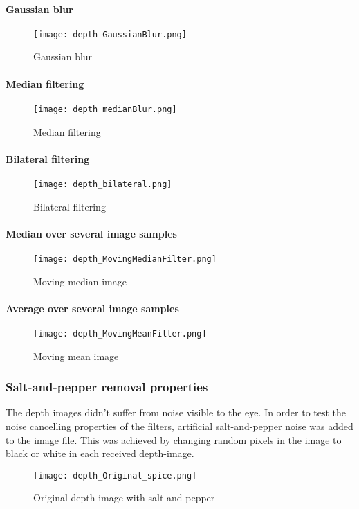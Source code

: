 \documentclass[DIV12,a4paper]{scrartcl}
\begin{document}
\paragraph{Gaussian blur}
\begin{figure}[!htbp]
  \centering
  \texttt{[image: depth\_GaussianBlur.png]}
  \caption{Gaussian blur}
  \label{fig:gaussian_blur}
\end{figure}
\paragraph{Median filtering}
\begin{figure}[!htbp]
  \centering
  \texttt{[image: depth\_medianBlur.png]}
  \caption{Median filtering}
  \label{fig:median_depth}
\end{figure}
\paragraph{Bilateral filtering}
\begin{figure}[!htbp]
  \centering
  \texttt{[image: depth\_bilateral.png]}
  \caption{Bilateral filtering}
  \label{fig:bilateral_depth}
\end{figure}
\paragraph{Median over several image samples}
\begin{figure}[!htbp]
  \centering
  \texttt{[image: depth\_MovingMedianFilter.png]}
  \caption{Moving median image}
  \label{fig:moving_median_depth}
\end{figure}
\paragraph{Average over several image samples}
\begin{figure}[!htbp]
  \centering
  \texttt{[image: depth\_MovingMeanFilter.png]}
  \caption{Moving mean image}
  \label{fig:moving_mean_depth}
\end{figure}
\subsubsection{Salt-and-pepper removal properties}
\label{sec:grain_removal}
The depth images didn't suffer from noise visible to the eye. In order to test the noise cancelling properties of the filters, artificial salt-and-pepper noise was added to the image file. This was achieved by changing random pixels in the image to black or white in each received depth-image. %
\par
\begin{figure}[!htbp]
  \centering
  \texttt{[image: depth\_Original\_spice.png]}
  \caption{Original depth image with salt and pepper}
  \label{fig:original_depth_spice}
\end{figure}
\end{document}
